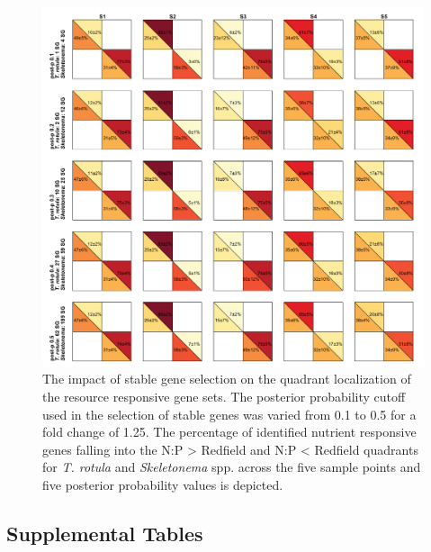 
\begin{figure}[p!]
  \centering
    \includegraphics[width=1\textwidth]{Images/C3_SFigure11_Quadrant.pdf}
    \caption[The impact of stable gene selction of quadrant localization]{The impact of stable gene selection on the quadrant localization of the resource responsive gene sets. The posterior probability cutoff used in the selection of stable genes was varied from 0.1 to 0.5 for a fold change of 1.25. The percentage of identified nutrient responsive genes falling into the N:P > Redfield and N:P < Redfield quadrants for \textit{T. rotula} and \textit{Skeletonema} spp. across the five sample points and five posterior probability values is depicted.}
  \label{fig:a3f11}
\end{figure}



\subsection{Supplemental Tables}


